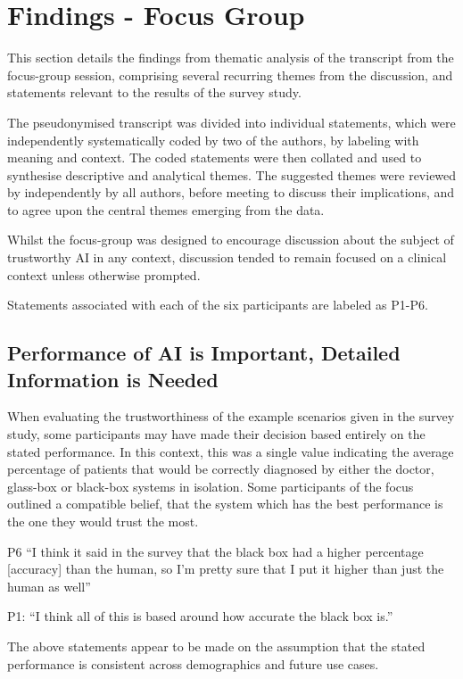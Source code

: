 \documentclass[manuscript,screen,review]{acmart}
\begin{document}
\section{Findings - Focus Group}

This section details the findings from thematic analysis of the transcript from the focus-group session, comprising several recurring themes from the discussion, and statements relevant to the results of the survey study. 

The pseudonymised transcript was divided into individual statements, which were independently systematically coded by two of the authors, by labeling with meaning and context. The coded statements were then collated and used to synthesise descriptive and analytical themes. The suggested themes were reviewed by independently by all authors, before meeting to discuss their implications, and to agree upon the central themes emerging from the data.    

Whilst the focus-group was designed to encourage discussion about the subject of trustworthy AI in any context, discussion tended to remain focused on a clinical context unless otherwise prompted.

Statements associated with each of the six participants are labeled as P1-P6. 


\subsection{Performance of AI is Important, Detailed Information is Needed}
When evaluating the trustworthiness of the example scenarios given in the survey study, some participants may have made their decision based entirely on the stated performance. In this context, this was a single value indicating the average percentage of patients that would be correctly diagnosed by either the doctor, glass-box or black-box systems in isolation. Some participants of the focus outlined a compatible belief, that the system which has the best performance is the one they would trust the most. 

P6 “I think it said in the survey that the black box had a higher percentage [accuracy] than the human, so I'm pretty sure that I put it higher than just the human as well”

P1: “I think all of this is based around how accurate the black box is.” 

The above statements appear to be made on the assumption that the stated performance is consistent across demographics and future use cases.
\end{document}
